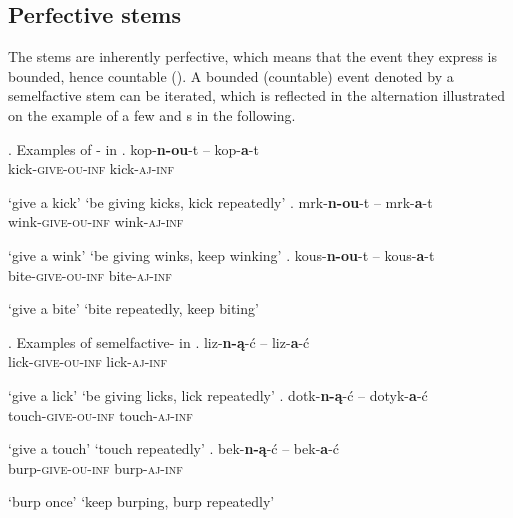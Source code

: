 \subsection{Perfective stems}

The  stems are inherently perfective, which means that the event they express is bounded, hence countable (\citealt{Renat1979,Bach1986,deSwart1998,Willim2006,Dickey2016}). A bounded (countable) event denoted by a semelfactive stem can be iterated, which is reflected in the  alternation illustrated on the example of a few  and  s in the following. 

\ex. Examples of - in 
\ag. 
kop-\textbf{n-ou}-t -- kop-\textbf{a}-t\\
kick-\textsc{give-ou}-\textsc{inf} {} kick-\textsc{aj}-\textsc{inf}\\
\strut `give a kick' \hskip 32pt `be giving kicks, kick repeatedly'
\bg. 
mrk-\textbf{n-ou}-t -- mrk-\textbf{a}-t\\
wink-\textsc{give-ou}-\textsc{inf} {} wink-\textsc{aj}-\textsc{inf}\\
\strut `give a wink' \hskip 32pt `be giving winks, keep winking'
\cg.
kous-\textbf{n-ou}-t -- kous-\textbf{a}-t\\
bite-\textsc{give-ou}-\textsc{inf} {} bite-\textsc{aj}-\textsc{inf}\\
\strut `give a bite' \hskip 33pt `bite repeatedly, keep biting'

\ex. Examples of semelfactive- in \label{polisz}
\ag. 
liz-\textbf{n-\k{a}}-\'c -- liz-\textbf{a}-\'c\\
lick-\textsc{give-ou}-\textsc{inf} {} lick-\textsc{aj}-\textsc{inf}\\
\strut `give a lick' \hskip 32pt `be giving licks, lick repeatedly'
\bg. 
dotk-\textbf{n-\k{a}}-\'c -- dotyk-\textbf{a}-\'c\\
touch-\textsc{give-ou}-\textsc{inf} {} touch-\textsc{aj}-\textsc{inf}\\
\strut `give a touch' \hskip 32pt `touch repeatedly'
\cg.
bek-\textbf{n-\k{a}}-\'c -- bek-\textbf{a}-\'c\\
burp-\textsc{give-ou}-\textsc{inf} {} burp-\textsc{aj}-\textsc{inf}\\
\strut `burp once' \hskip 38pt `keep burping, burp repeatedly'



